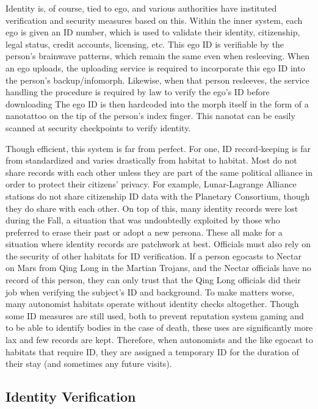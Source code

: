 Identity is, of course, tied to ego, and various 
authorities have instituted verification and security 
measures based on this. Within the inner system, each 
ego is given an ID number, which is used to validate 
their identity, citizenship, legal status, credit accounts, 
licensing, etc. This ego ID is verifiable by the person's 
brainwave patterns, which remain the same even 
when resleeving. When an ego uploads, the uploading
service is required to incorporate this ego ID into
the person's backup/infomorph. Likewise, when that 
person resleeves, the service handling the procedure 
is required by law to verify the ego's ID before downloading
The ego ID is then hardcoded into the morph
itself in the form of a nanotattoo on the tip of the person's
index finger. This nanotat can be easily scanned
at security checkpoints to verify identity.

Though efficient, this system is far from perfect. For 
one, ID record-keeping is far from standardized and 
varies drastically from habitat to habitat. Most do not 
share records with each other unless they are part of the 
same political alliance in order to protect their citizens' 
privacy. For example, Lunar-Lagrange Alliance stations 
do not share citizenship ID data with the Planetary 
Consortium, though they do share with each other. 
On top of this, many identity records were lost 
during the Fall, a situation that was undoubtedly exploited
by those who preferred to erase their past or
adopt a new persona. These all make for a situation 
where identity records are patchwork at best. Officials 
must also rely on the security of other habitats for ID 
verification. If a person egocasts to Nectar on Mars 
from Qing Long in the Martian Trojans, and the 
Nectar officials have no record of this person, they 
can only trust that the Qing Long officials did their 
job when verifying the subject's ID and background.
To make matters worse, many autonomist habitats 
operate without identity checks altogether. Though 
some ID measures are still used, both to prevent 
reputation system gaming and to be able to identify 
bodies in the case of death, these uses are significantly 
more lax and few records are kept. Therefore, when 
autonomists and the like egocast to habitats that require
ID, they are assigned a temporary ID for the duration
of their stay (and sometimes any future visits).

\subsection{Identity Verification}

